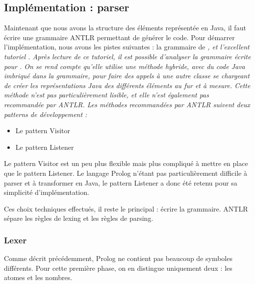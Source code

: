 \documentclass[../report.tex]{subfiles}
\begin{document}
\subsection{Implémentation : parser}
Maintenant que nous avons la structure des éléments représentée en Java, il faut écrire une grammaire ANTLR permettant de générer le code. Pour démarrer l'implémentation, nous avons les pistes suivantes : la grammaire de \sl{}, et l'excellent tutoriel \cite{ANTLRTutorial}. Après lecture de ce tutoriel, il est possible d'analyser la grammaire écrite pour \sl{}. On se rend compte qu'elle utilise une méthode hybride, avec du code Java imbriqué dans la grammaire, pour faire des appels à une autre classe se chargeant de créer les représentations Java des différents éléments au fur et à mesure. Cette méthode n'est pas particulièrement lisible, et elle n'est également pas recommandée par ANTLR. Les méthodes recommandées par ANTLR suivent deux patterns de développement :
\begin{itemize}
    \item Le pattern Visitor
    \item Le pattern Listener
\end{itemize}
Le pattern Visitor est un peu plus flexible mais plus compliqué à mettre en place que le pattern Listener. Le langage Prolog n'étant pas particulièrement difficile à parser et à transformer en Java, le pattern Listener a donc été retenu pour sa simplicité d'implémentation.

Ces choix techniques effectués, il reste le principal : écrire la grammaire. ANTLR sépare les règles de lexing et les règles de parsing.
\subsubsection{Lexer}
Comme décrit précédemment, Prolog ne contient pas beaucoup de symboles différents. Pour cette première phase, on en distingue uniquement deux : les atomes et les nombres.
\end{document}
